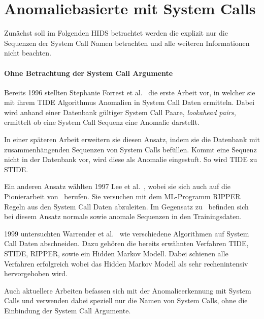     \section{Anomaliebasierte  mit System Calls}

    Zunächst soll im Folgenden \ac{HIDS} betrachtet werden die explizit nur die Sequenzen der System Call Namen betrachten und alle weiteren Informationen nicht beachten.

    \paragraph{Ohne Betrachtung der System Call Argumente}\label{sec:related_no_arg}
        Bereits 1996 stellten Stephanie Forrest et al.~\cite{FORREST} die erste Arbeit vor, in welcher sie mit ihrem \ac{TIDE} Algorithmus Anomalien in System Call Daten ermitteln.
        Dabei wird anhand einer Datenbank gültiger System Call Paare, \textit{lookahead pairs}, ermittelt ob eine System Call Sequenz eine Anomalie darstellt.

        In einer späteren Arbeit erweitern sie diesen Ansatz, indem sie die Datenbank mit zusammenhängenden Sequenzen von System Calls befüllen.
        Kommt eine Sequenz nicht in der Datenbank vor, wird diese als Anomalie eingestuft.
        So wird \ac{TIDE} zu \ac{STIDE}.~\cite{STIDE}

        Ein anderen Ansatz wählten 1997 Lee et al.~\cite{LEE1997}, wobei sie sich auch auf die Pionierarbeit von~\cite{FORREST} berufen.
        Sie versuchen mit dem \ac{ML}-Programm RIPPER Regeln aus den System Call Daten abzuleiten.
        Im Gegensatz zu~\cite{FORREST} befinden sich bei diesem Ansatz normale sowie anomale Sequenzen in den Trainingsdaten.

        1999 untersuchten Warrender et al.~\cite{STIDE_Alternatives} wie verschiedene Algorithmen auf System Call Daten abschneiden.
        Dazu gehören die bereits erwähnten Verfahren \ac{TIDE}, \ac{STIDE}, RIPPER, sowie ein Hidden Markov Modell.
        Dabei schienen alle Verfahren erfolgreich wobei das Hidden Markov Modell als sehr rechenintensiv hervorgehoben wird.
 
        Auch aktuellere Arbeiten befassen sich mit der Anomalieerkennung mit System Calls und verwenden dabei speziell nur die Namen von System Calls, ohne die Einbindung der System Call Argumente.
    
